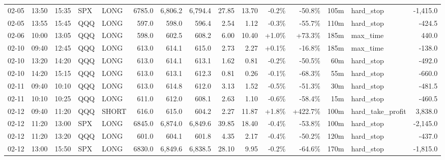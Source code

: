 \documentclass[11pt,a4paper,twoside]{article}
\begin{document}
\begin{landscape}
\begin{center}
\begin{longtable}{>{\color{txtmain}}l l l l l r r r r r r r r >{\color{txtmain}}l r}
02-05 & 13:50 & 15:35 & SPX & LONG & 6785.0 & 6,806.2 & 6,794.4 & 27.85 & 13.70 & \textcolor{lossred}{-0.2\%} & \textcolor{lossred}{-50.8\%} & 105m & hard\_stop & \textcolor{lossred}{-1,415.0} \\
02-05 & 13:55 & 15:45 & QQQ & LONG & 597.0 & 598.0 & 596.4 & 2.54 & 1.12 & \textcolor{lossred}{-0.3\%} & \textcolor{lossred}{-55.7\%} & 110m & hard\_stop & \textcolor{lossred}{-424.5} \\
02-06 & 10:00 & 13:05 & QQQ & LONG & 598.0 & 602.5 & 608.2 & 6.00 & 10.40 & \textcolor{wingreen}{+1.0\%} & \textcolor{wingreen}{+73.3\%} & 185m & max\_time & \textcolor{wingreen}{440.0} \\
02-10 & 09:40 & 12:45 & QQQ & LONG & 613.0 & 614.1 & 615.0 & 2.73 & 2.27 & \textcolor{wingreen}{+0.1\%} & \textcolor{lossred}{-16.8\%} & 185m & max\_time & \textcolor{lossred}{-138.0} \\
02-10 & 13:20 & 14:20 & QQQ & LONG & 613.0 & 614.1 & 613.1 & 1.62 & 0.81 & \textcolor{lossred}{-0.2\%} & \textcolor{lossred}{-50.5\%} & 60m & hard\_stop & \textcolor{lossred}{-492.0} \\
02-10 & 14:20 & 15:15 & QQQ & LONG & 613.0 & 613.1 & 612.3 & 0.81 & 0.26 & \textcolor{lossred}{-0.1\%} & \textcolor{lossred}{-68.3\%} & 55m & hard\_stop & \textcolor{lossred}{-660.0} \\
02-11 & 09:40 & 10:10 & QQQ & LONG & 613.0 & 614.8 & 612.0 & 3.13 & 1.52 & \textcolor{lossred}{-0.5\%} & \textcolor{lossred}{-51.3\%} & 30m & hard\_stop & \textcolor{lossred}{-481.5} \\
02-11 & 10:10 & 10:25 & QQQ & LONG & 611.0 & 612.0 & 608.1 & 2.63 & 1.10 & \textcolor{lossred}{-0.6\%} & \textcolor{lossred}{-58.4\%} & 15m & hard\_stop & \textcolor{lossred}{-460.5} \\
02-12 & 09:40 & 11:20 & QQQ & SHORT & 616.0 & 615.0 & 604.2 & 2.27 & 11.87 & \textcolor{wingreen}{+1.8\%} & \textcolor{wingreen}{+422.7\%} & 100m & hard\_take\_profit & \textcolor{wingreen}{3,838.0} \\
02-12 & 11:20 & 13:00 & SPX & LONG & 6845.0 & 6,874.0 & 6,849.6 & 39.85 & 18.40 & \textcolor{lossred}{-0.4\%} & \textcolor{lossred}{-53.8\%} & 100m & hard\_stop & \textcolor{lossred}{-2,145.0} \\
02-12 & 11:20 & 13:20 & QQQ & LONG & 601.0 & 604.1 & 601.8 & 4.35 & 2.17 & \textcolor{lossred}{-0.4\%} & \textcolor{lossred}{-50.2\%} & 120m & hard\_stop & \textcolor{lossred}{-437.0} \\
02-12 & 13:00 & 15:50 & SPX & LONG & 6830.0 & 6,849.6 & 6,838.5 & 28.10 & 9.95 & \textcolor{lossred}{-0.2\%} & \textcolor{lossred}{-64.6\%} & 170m & hard\_stop & \textcolor{lossred}{-1,815.0} \\

\end{longtable}
\end{center}
\end{landscape}
\end{document}
